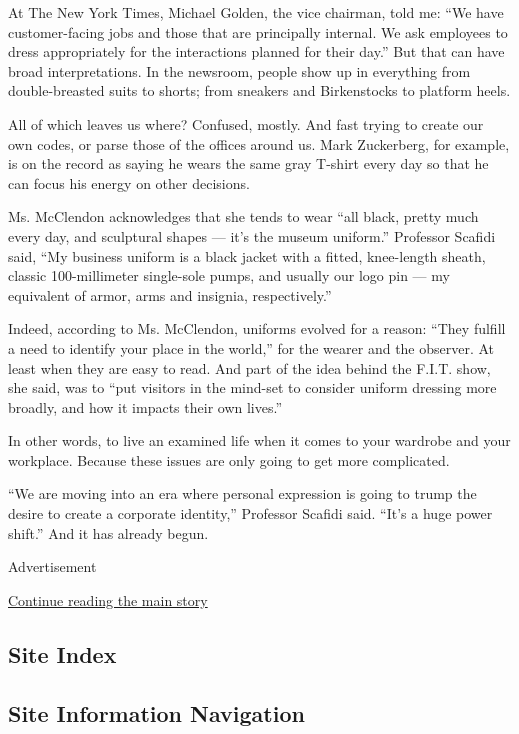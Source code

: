 At The New York Times, Michael Golden, the vice chairman, told me: ``We
have customer-facing jobs and those that are principally internal. We
ask employees to dress appropriately for the interactions planned for
their day.'' But that can have broad interpretations. In the newsroom,
people show up in everything from double-breasted suits to shorts; from
sneakers and Birkenstocks to platform heels.

All of which leaves us where? Confused, mostly. And fast trying to
create our own codes, or parse those of the offices around us. Mark
Zuckerberg, for example, is on the record as saying he wears the same
gray T-shirt every day so that he can focus his energy on other
decisions.

Ms. McClendon acknowledges that she tends to wear ``all black, pretty
much every day, and sculptural shapes --- it's the museum uniform.''
Professor Scafidi said, ``My business uniform is a black jacket with a
fitted, knee-length sheath, classic 100-millimeter single-sole pumps,
and usually our logo pin --- my equivalent of armor, arms and insignia,
respectively.''

Indeed, according to Ms. McClendon, uniforms evolved for a reason:
``They fulfill a need to identify your place in the world,'' for the
wearer and the observer. At least when they are easy to read. And part
of the idea behind the F.I.T. show, she said, was to ``put visitors in
the mind-set to consider uniform dressing more broadly, and how it
impacts their own lives.''

In other words, to live an examined life when it comes to your wardrobe
and your workplace. Because these issues are only going to get more
complicated.

``We are moving into an era where personal expression is going to trump
the desire to create a corporate identity,'' Professor Scafidi said.
``It's a huge power shift.'' And it has already begun.

Advertisement

\protect\hyperlink{after-bottom}{Continue reading the main story}

\hypertarget{site-index}{%
\subsection{Site Index}\label{site-index}}

\hypertarget{site-information-navigation}{%
\subsection{Site Information
Navigation}\label{site-information-navigation}}

